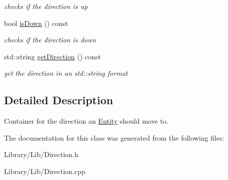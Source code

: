 \begin{DoxyCompactItemize}
\begin{DoxyCompactList}\small\item\em checks if the direction is up \end{DoxyCompactList}\item 
\hypertarget{classty_lib_1_1_direction_a89eae4f75382548435963affa0b21afa}{}bool \hyperlink{classty_lib_1_1_direction_a89eae4f75382548435963affa0b21afa}{is\+Down} () const \label{classty_lib_1_1_direction_a89eae4f75382548435963affa0b21afa}

\begin{DoxyCompactList}\small\item\em checks if the direction is down \end{DoxyCompactList}\item 
\hypertarget{classty_lib_1_1_direction_afc53092ec1d72f584636109a99e1245f}{}std\+::string \hyperlink{classty_lib_1_1_direction_afc53092ec1d72f584636109a99e1245f}{get\+Direction} () const \label{classty_lib_1_1_direction_afc53092ec1d72f584636109a99e1245f}

\begin{DoxyCompactList}\small\item\em get the direction in an std\+::string format \end{DoxyCompactList}\end{DoxyCompactItemize}


\subsection{Detailed Description}
Container for the direction an \hyperlink{classty_lib_1_1_entity}{Entity} should move to. 

The documentation for this class was generated from the following files\+:\begin{DoxyCompactItemize}
\item 
Library/\+Lib/Direction.\+h\item 
Library/\+Lib/Direction.\+cpp\end{DoxyCompactItemize}
